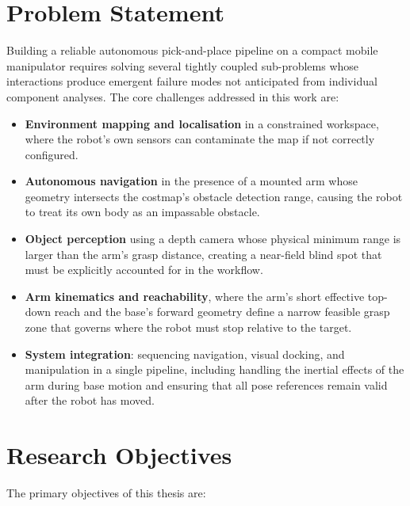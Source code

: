 \section{Problem Statement}
Building a reliable autonomous pick-and-place pipeline on a compact mobile manipulator
requires solving several tightly coupled sub-problems whose interactions produce
emergent failure modes not anticipated from individual component analyses. The core
challenges addressed in this work are:

\begin{itemize}
    \item \textbf{Environment mapping and localisation} in a constrained workspace,
    where the robot's own sensors can contaminate the map if not correctly configured.

    \item \textbf{Autonomous navigation} in the presence of a mounted arm whose
    geometry intersects the costmap's obstacle detection range, causing the robot to
    treat its own body as an impassable obstacle.

    \item \textbf{Object perception} using a depth camera whose physical minimum range
    is larger than the arm's grasp distance, creating a near-field blind spot that must
    be explicitly accounted for in the workflow.

    \item \textbf{Arm kinematics and reachability}, where the arm's short effective
    top-down reach and the base's forward geometry define a narrow feasible grasp zone
    that governs where the robot must stop relative to the target.

    \item \textbf{System integration}: sequencing navigation, visual docking, and
    manipulation in a single pipeline, including handling the inertial effects of the
    arm during base motion and ensuring that all pose references remain valid after the
    robot has moved.
\end{itemize}

\section{Research Objectives}
The primary objectives of this thesis are:

